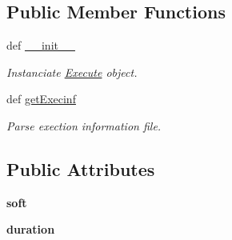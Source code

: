 \subsection*{\-Public \-Member \-Functions}
\begin{DoxyCompactItemize}
\item 
\hypertarget{classMycarn__stat_1_1Execute_1_1Execute_adfe8bf90004460049b38f9c601503292}{
def \hyperlink{classMycarn__stat_1_1Execute_1_1Execute_adfe8bf90004460049b38f9c601503292}{\-\_\-\-\_\-init\-\_\-\-\_\-}}
\label{classMycarn__stat_1_1Execute_1_1Execute_adfe8bf90004460049b38f9c601503292}

\begin{DoxyCompactList}\small\item\em \-Instanciate \hyperlink{classMycarn__stat_1_1Execute_1_1Execute}{\-Execute} object. \end{DoxyCompactList}\item 
def \hyperlink{classMycarn__stat_1_1Execute_1_1Execute_aca552794d8c41617adb97aea4a10ec1c}{get\-Execinf}
\begin{DoxyCompactList}\small\item\em \-Parse exection information file. \end{DoxyCompactList}\end{DoxyCompactItemize}
\subsection*{\-Public \-Attributes}
\begin{DoxyCompactItemize}
\item 
\hypertarget{classMycarn__stat_1_1Execute_1_1Execute_a573a91a921cb92fe7fdff30448582ae2}{
{\bfseries soft}}
\label{classMycarn__stat_1_1Execute_1_1Execute_a573a91a921cb92fe7fdff30448582ae2}

\item 
\hypertarget{classMycarn__stat_1_1Execute_1_1Execute_abba6a63b4d26caf74efcd887659d4c36}{
{\bfseries duration}}
\label{classMycarn__stat_1_1Execute_1_1Execute_abba6a63b4d26caf74efcd887659d4c36}

\end{DoxyCompactItemize}


